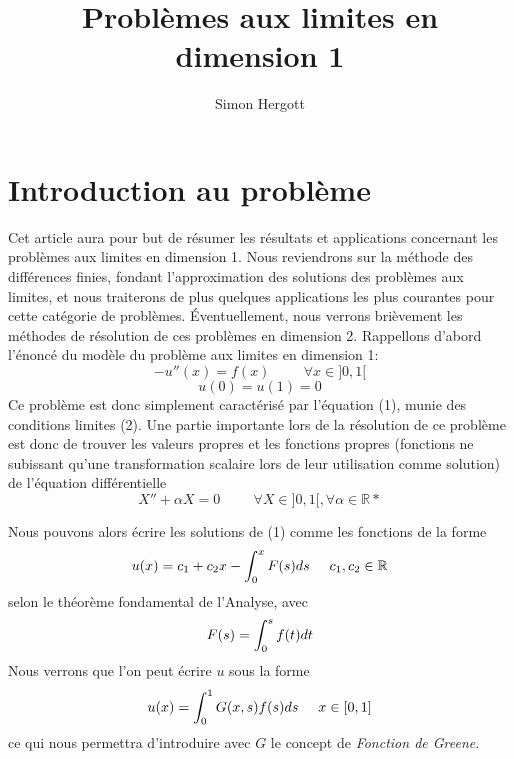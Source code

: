 \documentclass[11pt]{article}
\title{Problèmes aux limites en dimension 1} %
\author{Simon Hergott} %
\newcommand{\R}{\mathbb R}
\newcommand{\espace}{\hspace{5mm}}
\begin{document}
	\maketitle
	
\section{Introduction au problème}

\quad Cet article aura pour but de résumer les résultats et applications concernant les problèmes aux limites en dimension 1. Nous reviendrons sur la méthode des différences finies, fondant l'approximation des solutions des problèmes aux limites, et nous traiterons de plus quelques applications les plus courantes pour cette catégorie de problèmes. Éventuellement, nous verrons brièvement les méthodes de résolution de ces problèmes en dimension 2.
Rappellons d'abord l'énoncé du modèle du problème aux limites en dimension 1:
\begin{equation}
-u''(x) = f(x) \hspace{1cm} \forall x \in ]0,1[ 
\end{equation}
\begin{equation}
u(0) = u(1) = 0
\end{equation}
\quad Ce problème est donc simplement caractérisé par l'équation (1), munie des conditions limites (2). Une partie importante lors de la résolution de ce problème est donc de trouver les valeurs propres et les fonctions propres (fonctions ne subissant qu'une transformation scalaire lors de leur utilisation comme solution) de l'équation différentielle
\begin{equation}
	X'' + \alpha X = 0 \hspace{1cm} \forall X \in ]0,1[ , \forall \alpha \in \mathbb R*
\end{equation}

\quad Nous pouvons alors écrire les solutions de (1) comme les fonctions de la forme
\begin{equation}
	u\relax(x) = c_1 + c_2 x - \int_0^x F(s) ds \espace c_1 , c_2 \in \R
\end{equation}
selon le théorème fondamental de l'Analyse, avec 
\begin{equation}
	F\relax(s) = \int_0^s f(t) dt
\end{equation}
\quad Nous verrons que l'on peut écrire $u$ sous la forme
\begin{equation}
	u\relax(x) = \int_0^1 G\relax(x, s) f\relax(s) ds \espace x \in [0, 1]
\end{equation}
ce qui nous permettra d'introduire avec $G$ le concept de \emph{Fonction de Greene}.
\end{document}
